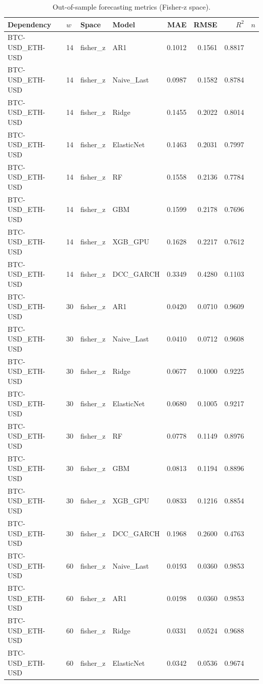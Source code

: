\begin{table}[H]
\centering
\small
\caption{Out-of-sample forecasting metrics (Fisher-z space).}
\label{tab:model_comparison}
\begin{tabular}{llllrrrr}
\toprule
Dependency & $w$ & Space & Model & MAE & RMSE & $R^2$ & $n$ \\
\midrule
BTC-USD_ETH-USD & 14 & fisher_z & AR1 & 0.1012 & 0.1561 & 0.8817 &  \\
BTC-USD_ETH-USD & 14 & fisher_z & Naive_Last & 0.0987 & 0.1582 & 0.8784 &  \\
BTC-USD_ETH-USD & 14 & fisher_z & Ridge & 0.1455 & 0.2022 & 0.8014 &  \\
BTC-USD_ETH-USD & 14 & fisher_z & ElasticNet & 0.1463 & 0.2031 & 0.7997 &  \\
BTC-USD_ETH-USD & 14 & fisher_z & RF & 0.1558 & 0.2136 & 0.7784 &  \\
BTC-USD_ETH-USD & 14 & fisher_z & GBM & 0.1599 & 0.2178 & 0.7696 &  \\
BTC-USD_ETH-USD & 14 & fisher_z & XGB_GPU & 0.1628 & 0.2217 & 0.7612 &  \\
BTC-USD_ETH-USD & 14 & fisher_z & DCC_GARCH & 0.3349 & 0.4280 & 0.1103 &  \\
BTC-USD_ETH-USD & 30 & fisher_z & AR1 & 0.0420 & 0.0710 & 0.9609 &  \\
BTC-USD_ETH-USD & 30 & fisher_z & Naive_Last & 0.0410 & 0.0712 & 0.9608 &  \\
BTC-USD_ETH-USD & 30 & fisher_z & Ridge & 0.0677 & 0.1000 & 0.9225 &  \\
BTC-USD_ETH-USD & 30 & fisher_z & ElasticNet & 0.0680 & 0.1005 & 0.9217 &  \\
BTC-USD_ETH-USD & 30 & fisher_z & RF & 0.0778 & 0.1149 & 0.8976 &  \\
BTC-USD_ETH-USD & 30 & fisher_z & GBM & 0.0813 & 0.1194 & 0.8896 &  \\
BTC-USD_ETH-USD & 30 & fisher_z & XGB_GPU & 0.0833 & 0.1216 & 0.8854 &  \\
BTC-USD_ETH-USD & 30 & fisher_z & DCC_GARCH & 0.1968 & 0.2600 & 0.4763 &  \\
BTC-USD_ETH-USD & 60 & fisher_z & Naive_Last & 0.0193 & 0.0360 & 0.9853 &  \\
BTC-USD_ETH-USD & 60 & fisher_z & AR1 & 0.0198 & 0.0360 & 0.9853 &  \\
BTC-USD_ETH-USD & 60 & fisher_z & Ridge & 0.0331 & 0.0524 & 0.9688 &  \\
BTC-USD_ETH-USD & 60 & fisher_z & ElasticNet & 0.0342 & 0.0536 & 0.9674 &  \\

\end{tabular}
\end{table}
